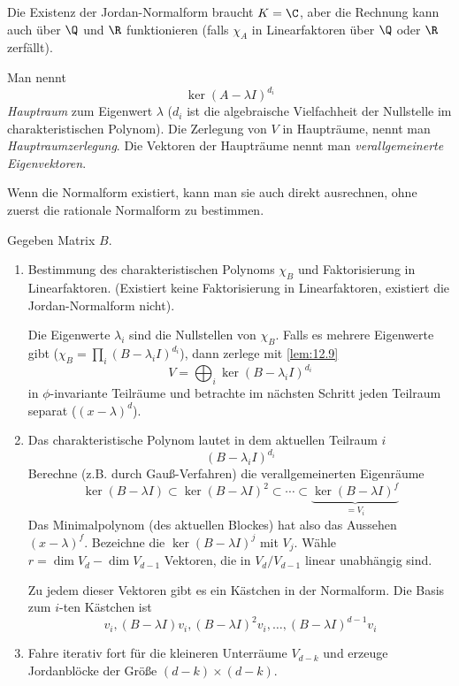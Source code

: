 \documentclass[a4paper, 10pt]{scrbook}
\begin{document}
\begin{note}
	Die Existenz der Jordan-Normalform braucht $K=\C$, aber die Rechnung kann auch über $\Q$ und $\R$ funktionieren (falls $\chi_A$ in Linearfaktoren über $\Q$ oder $\R$ zerfällt).
\end{note}

\begin{df*}
	Man nennt
	\[
		\ker(A -\lambda I)^{d_i}
	\]
	\emph{Hauptraum} zum Eigenwert $\lambda$ ($d_i$ ist die algebraische Vielfachheit der Nullstelle im charakteristischen Polynom).
	Die Zerlegung von $V$ in Haupträume, nennt man \emph{Hauptraumzerlegung}.
	Die Vektoren der Haupträume nennt man \emph{verallgemeinerte Eigenvektoren}.
\end{df*}

Wenn die Normalform existiert, kann man sie auch direkt ausrechnen, ohne zuerst die rationale Normalform zu bestimmen.

\begin{alg*}
	Gegeben Matrix $B$.
	\begin{enumerate}[{Schritt} 1]
		\item
			Bestimmung des charakteristischen Polynoms $\chi_B$ und Faktorisierung in Linearfaktoren.
			(Existiert keine Faktorisierung in Linearfaktoren, existiert die Jordan-Normalform nicht).

			Die Eigenwerte $\lambda_i$ sind die Nullstellen von $\chi_B$.
			Falls es mehrere Eigenwerte gibt ($\chi_B = \prod_i (B-\lambda_i I)^{d_i}$), dann zerlege mit \ref{lem:12.9}
			\[
				V = \bigoplus_i \ker(B-\lambda_i I)^{d_i}
			\]
			in $\phi$-invariante Teilräume und betrachte im nächsten Schritt jeden Teilraum separat ($(x-\lambda)^d$).
		\item
			Das charakteristische Polynom lautet in dem aktuellen Teilraum $i$
			\[
				(B-\lambda_i I)^{d_i}
			\]
			Berechne (z.B. durch Gauß-Verfahren) die verallgemeinerten Eigenräume
			\[
				\ker(B-\lambda I) \subset \ker(B-\lambda I)^2 \subset \dotsb \subset \underbrace{\ker(B-\lambda I)^f}_{=V_i}
			\]
			Das Minimalpolynom (des aktuellen Blockes) hat also das Aussehen $(x-\lambda)^f$.
			Bezeichne die $\ker(B-\lambda I)^j$ mit $V_j$.
			Wähle $r = \dim V_d - \dim V_{d-1}$ Vektoren, die in $V_d/V_{d-1}$ linear unabhängig sind.
			
			Zu jedem dieser Vektoren gibt es ein Kästchen in der Normalform.
			Die Basis zum $i$-ten Kästchen ist
			\[
				v_i, (B-\lambda I)v_i, (B-\lambda I)^2v_i, \dotsc, (B-\lambda I)^{d-1}v_i
			\]
		\item
			Fahre iterativ fort für die kleineren Unterräume $V_{d-k}$ und erzeuge Jordanblöcke der Größe $(d-k)\times (d-k)$.
	\end{enumerate}
\end{alg*}
\end{document}
